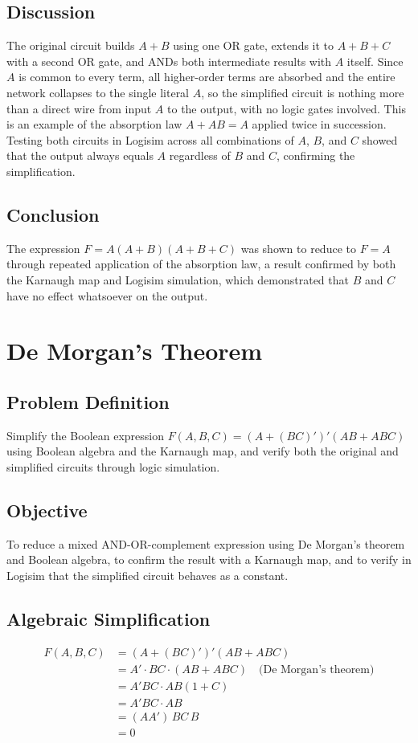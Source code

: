 \documentclass[12pt]{article}
\begin{document}
\subsection*{Discussion}
The original circuit builds $A+B$ using one OR gate, extends it to $A+B+C$ with a second OR gate, and ANDs both intermediate results with $A$ itself. Since $A$ is common to every term, all higher-order terms are absorbed and the entire network collapses to the single literal $A$, so the simplified circuit is nothing more than a direct wire from input $A$ to the output, with no logic gates involved. This is an example of the absorption law $A + AB = A$ applied twice in succession. Testing both circuits in Logisim across all combinations of $A$, $B$, and $C$ showed that the output always equals $A$ regardless of $B$ and $C$, confirming the simplification.

\subsection*{Conclusion}
The expression $F = A(A+B)(A+B+C)$ was shown to reduce to $F = A$ through repeated application of the absorption law, a result confirmed by both the Karnaugh map and Logisim simulation, which demonstrated that $B$ and $C$ have no effect whatsoever on the output.

\vspace{2cm}
\section{De Morgan's Theorem}

\subsection*{Problem Definition}
Simplify the Boolean expression $F(A,B,C) = (A + (BC)')'(AB + ABC)$ using Boolean algebra and the Karnaugh map, and verify both the original and simplified circuits through logic simulation.

\subsection*{Objective}
To reduce a mixed AND-OR-complement expression using De Morgan's theorem and Boolean algebra, to confirm the result with a Karnaugh map, and to verify in Logisim that the simplified circuit behaves as a constant.

\subsection*{Algebraic Simplification}
\begin{align*}
F(A,B,C) &= (A + (BC)')'(AB + ABC) \\
&= A' \cdot BC \cdot (AB + ABC) \quad \text{(De Morgan's theorem)} \\
&= A'BC \cdot AB(1+C) \\
&= A'BC \cdot AB \\
&= (AA')\,BC\,B \\
&= 0
\end{align*}
\end{document}
